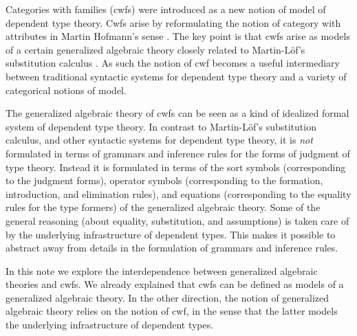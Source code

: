 \documentclass{lmcs}
\newcommand{\FYI}[1]{{\color{red}#1}}
\def\Cwf{\mathbf{CwF}}
\begin{document}
Categories with families (cwfs) \cite{dybjer:torino} were introduced as a new notion of model of dependent type theory. Cwfs arise by reformulating the notion of category with attributes in Martin Hofmann's sense \cite{hofmann:csl}. The key point is that cwfs arise as models of a certain generalized algebraic theory closely related to Martin-Löf's substitution calculus \cite{martinlof:gbg92}. As such the notion of cwf becomes a useful intermediary between traditional syntactic systems for dependent type theory and a variety of categorical notions of model.

The generalized algebraic theory of cwfs can be seen as a kind of idealized formal system of dependent type theory. In contrast to Martin-Löf's substitution calculus, and other syntactic systems for dependent type theory, it is {\em not} formulated in terms of grammars and inference rules for the forms of judgment of type theory. Instead it is formulated in terms of the sort symbols (corresponding to the judgment forms), operator symbols (corresponding to the formation, introduction, and elimination rules), and equations (corresponding to the equality rules for the type formers) of the generalized algebraic theory. Some of the general reasoning (about equality, substitution, and assumptions) is taken care of by the underlying infrastructure of dependent types. This makes it possible to abstract away from details in the formulation of grammars and inference rules.

In this note we explore the interdependence between generalized algebraic theories and cwfs. We already explained that cwfs can be defined as models of a generalized algebraic theory.
In the other direction, the notion of generalized algebraic theory relies on the notion of cwf, in the sense that the latter models the underlying infrastructure of dependent types.

\end{document}
